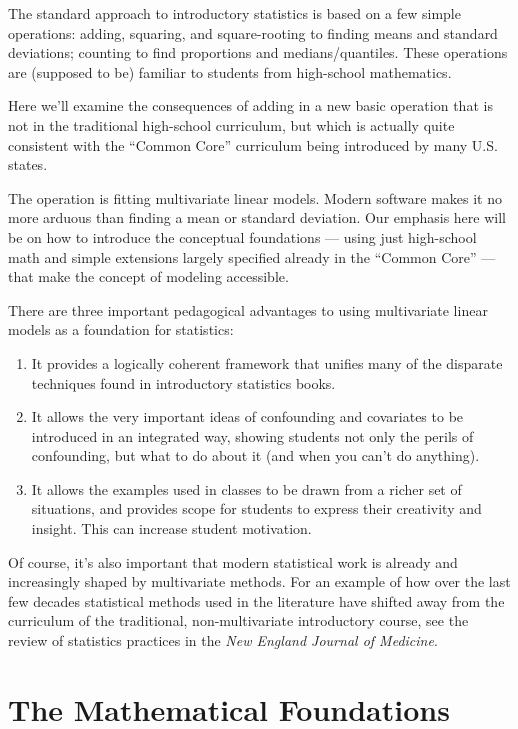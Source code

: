 The standard approach to introductory statistics is based on a few
simple operations: adding, squaring, and square-rooting to finding means 
and standard deviations; 
counting to find proportions and medians/quantiles.  These operations are
(supposed to be) familiar to students from high-school mathematics.

Here we'll examine the consequences of adding in a new basic operation
that is not in the traditional high-school curriculum, but which is
actually quite consistent with the ``Common Core'' curriculum being
introduced by many U.S. states.\cite{common-core-2010}


The operation is fitting multivariate linear models.  Modern software
makes it no more arduous than finding a mean or standard deviation.
Our emphasis here will be on how to introduce the conceptual
foundations --- using just high-school math and simple extensions
largely specified already in the ``Common Core'' --- that make the concept
of modeling accessible.

There are three important pedagogical advantages to using multivariate linear models
as a foundation for statistics:
\begin{enumerate}
  \item It provides a logically coherent framework that unifies many
    of the disparate techniques found in introductory statistics books.
  \item It allows the very important ideas of confounding and
    covariates to be introduced in an integrated way, showing students
    not only the perils of confounding, but what to do about it (and
    when you can't do anything).
  \item It allows the examples used in classes to be drawn from a
    richer set of situations, and provides scope for students to
    express their creativity and insight.  This can increase student
    motivation.
\end{enumerate}
Of course, it's also important that modern statistical work is already
and increasingly shaped by multivariate methods.  For an example of
how over the last few decades statistical methods used in the
literature have shifted away from the curriculum of the traditional,
non-multivariate introductory course, see the review of statistics
practices in the \emph{New England Journal of Medicine}. \cite{switzer-horton-2005}

\section{The Mathematical Foundations}

